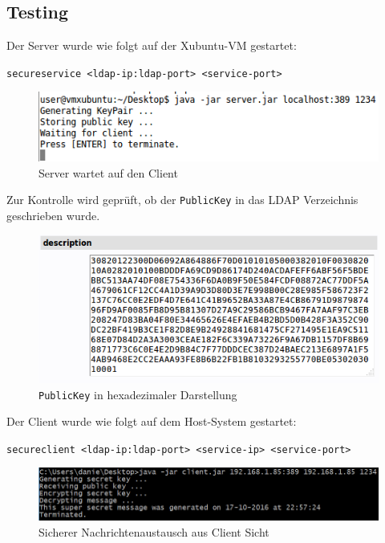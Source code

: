 \subsection{Testing}
Der Server wurde wie folgt auf der Xubuntu-VM gestartet:

\texttt{secureservice <ldap-ip:ldap-port> <service-port>}

\begin{figure}[!h]
	\begin{center}
		\includegraphics[width=0.6\linewidth]{images/server.png}
		\caption{Server wartet auf den Client}
		\label{server}
	\end{center}
\end{figure}

Zur Kontrolle wird geprüft, ob der \texttt{PublicKey} in das LDAP Verzeichnis geschrieben wurde.

\begin{figure}[!h]
	\begin{center}
		\includegraphics[width=0.6\linewidth]{images/ldap.png}
		\caption{\texttt{PublicKey} in hexadezimaler Darstellung}
		\label{ldap}
	\end{center}
\end{figure}
 
Der Client wurde wie folgt auf dem Host-System gestartet:

\texttt{secureclient <ldap-ip:ldap-port> <service-ip> <service-port>}

\begin{figure}[!h]
	\begin{center}
		\includegraphics[width=0.9\linewidth]{images/client.png}
		\caption{Sicherer Nachrichtenaustausch aus Client Sicht}
		\label{client}
	\end{center}
\end{figure}

